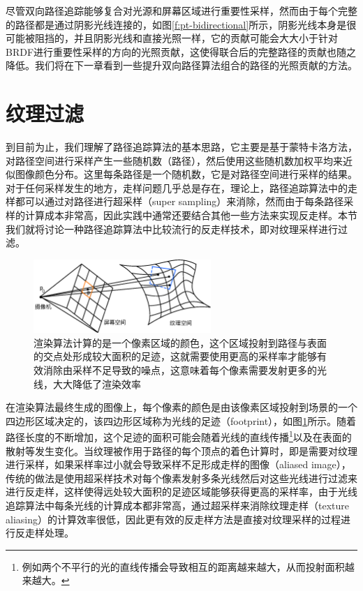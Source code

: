 尽管双向路径追踪能够复合对光源和屏幕区域进行重要性采样，然而由于每个完整的路径都是通过阴影光线连接的，如图\ref{f:pt-bidirectional}所示，阴影光线本身是很可能被阻挡的，并且阴影光线和直接光照一样，它的贡献可能会大大小于针对BRDF进行重要性采样的方向的光照贡献，这使得联合后的完整路径的贡献也随之降低。我们将在下一章看到一些提升双向路径算法组合的路径的光照贡献的方法。







\section{纹理过滤}\label{sec:pt-texture-filtering}
到目前为止，我们理解了路径追踪算法的基本思路，它主要是基于蒙特卡洛方法，对路径空间进行采样产生一些随机数（路径），然后使用这些随机数加权平均来近似图像颜色分布。这里每条路径是一个随机数，它是对路径空间进行采样的结果。对于任何采样发生的地方，走样问题几乎总是存在，理论上，路径追踪算法中的走样都可以通过对路径进行超采样（super sampling）来消除，然而由于每条路径采样的计算成本非常高，因此实践中通常还要结合其他一些方法来实现反走样。本节我们就将讨论一种路径追踪算法中比较流行的反走样技术，即对纹理采样进行过滤。

\begin{figure}
	\sidecaption
	\includegraphics[width=0.6\textwidth]{figures/pt/filter-size}
	\caption{渲染算法计算的是一个像素区域的颜色，这个区域投射到路径与表面的交点处形成较大面积的足迹，这就需要使用更高的采样率才能够有效消除由采样不足导致的噪点，这意味着每个像素需要发射更多的光线，大大降低了渲染效率}
	\label{f:pt-filter-size}
\end{figure}

在渲染算法最终生成的图像上，每个像素的颜色是由该像素区域投射到场景的一个四边形区域决定的，该四边形区域称为光线的足迹（footprint），如图\ref{f:pt-filter-size}所示。随着路径长度的不断增加，这个足迹的面积可能会随着光线的直线传播\footnote{例如两个不平行的光的直线传播会导致相互的距离越来越大，从而投射面积越来越大。}以及在表面的散射等发生变化。当纹理被作用于路径的每个顶点的着色计算时，即是需要对纹理进行采样，如果采样率过小就会导致采样不足形成走样的图像（aliased image），传统的做法是使用超采样技术对每个像素发射多条光线然后对这些光线进行过滤来进行反走样，这样使得远处较大面积的足迹区域能够获得更高的采样率，由于光线追踪算法中每条光线的计算成本都非常高，通过超采样来消除纹理走样（texture aliasing）的计算效率很低，因此更有效的反走样方法是直接对纹理采样的过程进行反走样处理。

